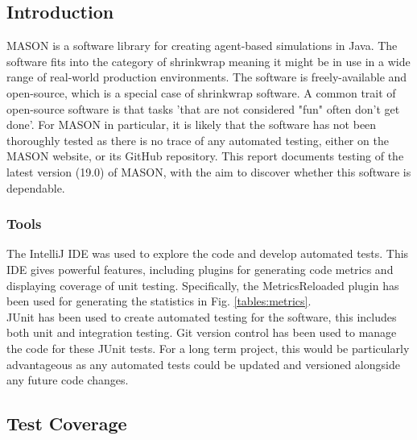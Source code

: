 \documentclass[11pt]{article}
\begin{document}
\subsection{Introduction}
MASON is a software library for creating agent-based simulations in Java. 
The software fits into the category of shrinkwrap meaning it might be in use in a wide range of real-world production environments. The software is freely-available and open-source, which is a special case of shrinkwrap software. A common trait of open-source software is that tasks 'that are not considered "fun" often don't get done'.\cite{five_worlds}
For MASON in particular, it is likely that the software has not been thoroughly tested as there is no trace of any automated testing, either on the MASON website, or its GitHub repository.
This report documents testing of the latest version (19.0) of MASON, with the aim to discover whether this software is dependable.

\subsubsection{Tools}
The IntelliJ IDE was used to explore the code and develop automated tests.
This IDE gives powerful features, including plugins for generating code metrics and displaying coverage of unit testing.
Specifically, the MetricsReloaded plugin\cite{metrics_reloaded} has been used for generating the statistics in Fig. \ref{tables:metrics}.
\\

JUnit has been used to create automated testing for the software, this includes both unit and integration testing.
Git version control has been used to manage the code for these JUnit tests.
For a long term project, this would be particularly advantageous as any automated tests could be updated and versioned alongside any future code changes.

\subsection{Test Coverage}
\end{document}
